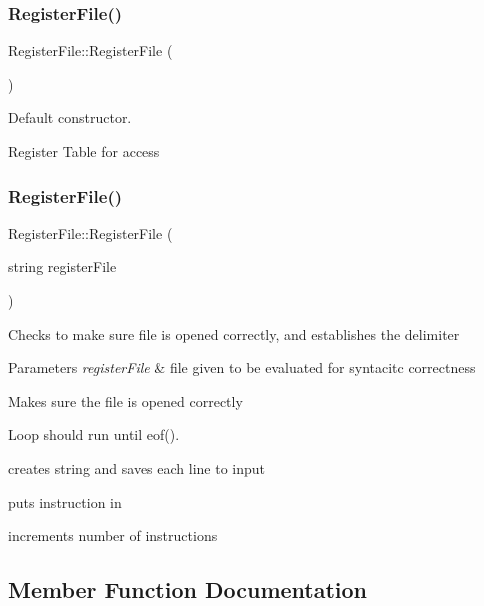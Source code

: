 \subsubsection{\texorpdfstring{Register\+File()}{RegisterFile()}\hspace{0.1cm}{\footnotesize\ttfamily [1/2]}}
{\footnotesize\ttfamily Register\+File\+::\+Register\+File (\begin{DoxyParamCaption}{ }\end{DoxyParamCaption})}



Default constructor. 

Register Table for access \mbox{\label{class_register_file_a9085db6aaabf8e55819d8bbd73f521b4}} 
\subsubsection{\texorpdfstring{Register\+File()}{RegisterFile()}\hspace{0.1cm}{\footnotesize\ttfamily [2/2]}}
{\footnotesize\ttfamily Register\+File\+::\+Register\+File (\begin{DoxyParamCaption}\item[{string}]{register\+File }\end{DoxyParamCaption})}

Checks to make sure file is opened correctly, and establishes the delimiter 
\begin{DoxyParams}{Parameters}
{\em register\+File} & file given to be evaluated for syntacitc correctness \\
\hline
\end{DoxyParams}
Makes sure the file is opened correctly

Loop should run until eof().

creates string and saves each line to input

puts instruction in

increments number of instructions 

\subsection{Member Function Documentation}
\mbox{\label{class_register_file_a54d87ad82368cfa1dfb8b3f01a3d2e5a}} 
